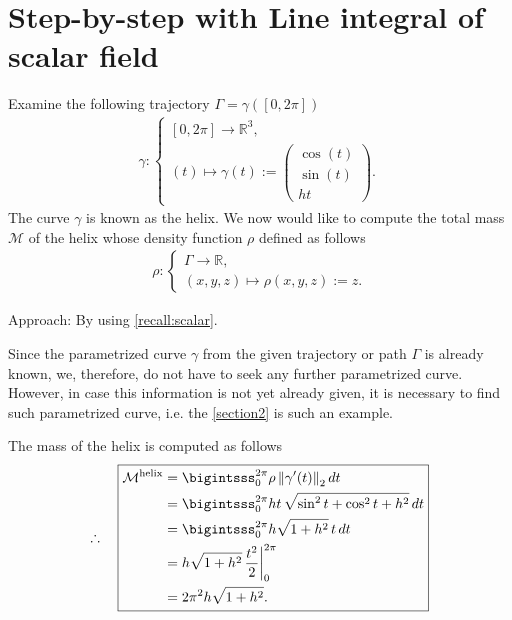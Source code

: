\documentclass[12pt]{article}
\begin{document}
\section{Step-by-step with Line integral of scalar field}
\begin{exampleboxed}
	Examine the following trajectory $\Gamma = \gamma([0,2\pi])$
	\begin{align}
		\gamma:
		\begin{cases}
			[0,2\pi]\rightarrow\mathbb{R}^3 , \\ 
			(t) \mapsto \gamma(t) := 
			\begin{pmatrix} \cos(t) \\ \sin(t) \\ ht \end{pmatrix}.
		\end{cases}
	\end{align}
	The curve $\gamma$ is known as the helix. 
	We now would like to compute the total mass $\mathcal{M}$ of the helix
	whose density function $\rho$ defined as follows
	\begin{align}
		\rho: 
		\begin{cases}
			\Gamma \to \mathbb{R}, \\
			(x,y,z) \mapsto \rho(x,y,z) := z.
		\end{cases}
	\end{align}
\end{exampleboxed}
Approach: By using \cref{recall:scalar}.
\begin{observationboxed}
	Since the parametrized curve $\gamma$ from the given trajectory or path $\Gamma$ is already known, 
	we, therefore, do not have to seek any further parametrized curve.
	However, in case this information is not yet already given, it is necessary to find such parametrized curve,
	i.e. the \cref{section2} is such an example.
\end{observationboxed}
The mass of the helix is computed as follows
\begin{align*}
	\therefore\quad\boxed{
		\begin{aligned}
			\mathcal{M}^{\text{helix}}
			 & = \bigintsss_0^{2\pi} \rho \, {\|\gamma'(t)\|}_2 \, dt               \\
			 & = \bigintsss_0^{2\pi} h  t \, \sqrt{\sin^2 t + \cos^2 t + h^2} \, dt \\
			 & = \bigintsss_0^{2\pi} h  \sqrt{1 + h^2} \, t \, dt                   \\
			 & = h  \sqrt{1+h^2} \, \frac{t^2}2 \bigg|_0^{2\pi}                     \\
			 & = 2 \pi^2 h \sqrt{1+h^2}.		
		\end{aligned}
	}
\end{align*}
\clearpage
\end{document}
